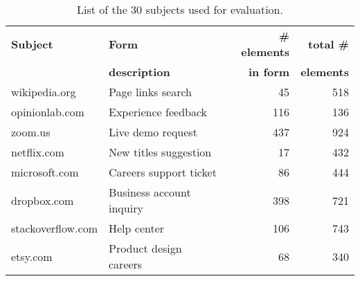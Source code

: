 \renewcommand{\arraystretch}{0.7}
\begin{table}
\caption{List of the 30 subjects used for evaluation.}
\label{table:subjects}
\centering
\begin{tabularx}{0.85\columnwidth}{llrr}
\hline
\small \textbf{Subject}  &  \small \textbf{Form} 						& \small \textbf{\# elements}  & \small \textbf{total \#} 		\\ %
\small \textbf{}  &  \small \textbf{description} 			& \small \textbf{in form}  		& \small \textbf{elements} 			\\ %
\hline
\footnotesize wikipedia.org     & \footnotesize Page links search   					&	\footnotesize	45     						  &	\footnotesize 518				\\ %
\footnotesize opinionlab.com    & \footnotesize Experience feedback      &		\footnotesize 116     						  &	\footnotesize 136							\\ %
\footnotesize zoom.us           & \footnotesize Live demo request      				&		\footnotesize 437     						  &	\footnotesize 924				\\ %
\footnotesize netflix.com       & \footnotesize New titles suggestion      			&	   \footnotesize 17     						  &	\footnotesize 432			\\ %
\footnotesize microsoft.com     & \footnotesize Careers support ticket      		&		\footnotesize 86     						  &	\footnotesize 444				\\ %
\footnotesize dropbox.com       & \footnotesize Business account inquiry      		&		\footnotesize 398     						  &	\footnotesize 721			\\ %
\footnotesize stackoverflow.com & \footnotesize Help center      						&     \footnotesize 106     						  &	\footnotesize 743				\\ %
\footnotesize etsy.com          & \footnotesize Product design careers      		&		\footnotesize 68     						  &	\footnotesize 340				\\ %

\end{tabularx}
\end{table}
